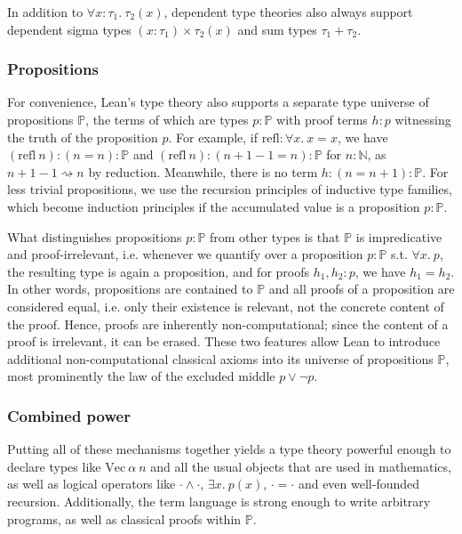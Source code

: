 In addition to $\forall x : \tau_1.\ \tau_2(x)$, dependent type theories also always support dependent sigma types $(x : \tau_1) \times \tau_2(x)$ and sum types $\tau_1 + \tau_2$.

\subsubsection{Propositions}
For convenience, Lean's type theory also supports a separate type universe of propositions $\mathbb{P}$, the terms of which are types $p : \mathbb{P}$ with proof terms $h : p$ witnessing the truth of the proposition $p$. For example, if $\mathrm{refl} : \forall x.\ x = x$, we have $(\mathrm{refl}\ n) : (n = n) : \mathbb{P}$ and $(\mathrm{refl}\ n) : (n + 1 - 1 = n) : \mathbb{P}$ for $n : \mathbb{N}$, as $n + 1 - 1 \rightsquigarrow n$ by reduction. Meanwhile, there is no term $h : (n = n + 1) : \mathbb{P}$. For less trivial propositions, we use the recursion principles of inductive type families, which become induction principles if the accumulated value is a proposition $p : \mathbb{P}$. 

What distinguishes propositions $p : \mathbb{P}$ from other types is that $\mathbb{P}$ is impredicative and proof-irrelevant, i.e. whenever we quantify over a proposition $p : \mathbb{P}$ s.t. $\forall x.\ p$, the resulting type is again a proposition, and for proofs $h_1, h_2 : p$, we have $h_1 = h_2$. In other words, propositions are contained to $\mathbb{P}$ and all proofs of a proposition are considered equal, i.e. only their existence is relevant, not the concrete content of the proof. Hence, proofs are inherently non-computational; since the content of a proof is irrelevant, it can be erased. These two features allow Lean to introduce additional non-computational classical axioms into its universe of propositions $\mathbb{P}$, most prominently the law of the excluded middle $p \lor \lnot p$.

\subsubsection{Combined power}
Putting all of these mechanisms together yields a type theory powerful enough to declare types like $\mathrm{Vec}\ \alpha\ n$ and all the usual objects that are used in mathematics, as well as logical operators like $\cdot \land \cdot$, $\exists x.\ p(x)$, $\cdot = \cdot$ and even well-founded recursion. Additionally, the term language is strong enough to write arbitrary programs, as well as classical proofs within $\mathbb{P}$.

